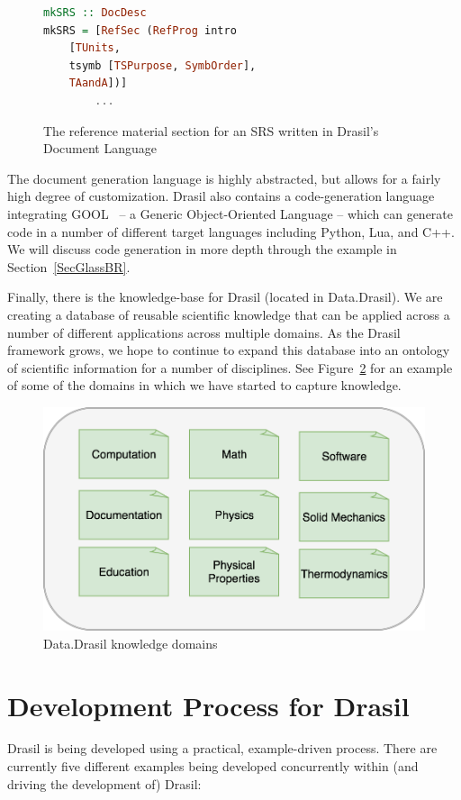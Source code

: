 \documentclass[sigconf]{acmart}
\begin{document}
\begin{figure}
\begin{lstlisting}[language=Haskell, frame=single, showstringspaces=false, 
basicstyle=\small]
mkSRS :: DocDesc 
mkSRS = [RefSec (RefProg intro 
	[TUnits, 
	tsymb [TSPurpose, SymbOrder], 
	TAandA])]
        ...
\end{lstlisting}
\caption{The reference material section for an SRS written in Drasil's Document 
Language}
\label{recipeLang}
\end{figure}

The document generation language is highly abstracted, but allows for a fairly
high degree of customization. Drasil also contains a code-generation language
integrating GOOL~\cite{Costabile2012} -- a Generic Object-Oriented Language -- which can
generate code in a number of different target languages including Python, Lua,
and C++.  We will discuss code generation in more depth through the example in
Section~\ref{SecGlassBR}.

Finally, there is the knowledge-base for Drasil (located in Data.Drasil). We 
are creating a database of reusable scientific knowledge that can be applied 
across a number of different applications across multiple domains. As the 
Drasil framework grows, we hope to continue to expand this database into an 
ontology of scientific information for a number of disciplines. See 
Figure~\ref{ontology} for an example of some of the domains in which we have 
started to capture knowledge.

\begin{figure}
	\includegraphics[width=.5\textwidth]{figures/ontology.png}
	\caption{Data.Drasil knowledge domains}
	\label{ontology}
\end{figure}

\section{Development Process for Drasil} \label{SecDevProcess}

Drasil is being developed using a practical, example-driven process. There are 
currently five different examples being developed concurrently within (and 
driving the development of) Drasil:
\end{document}
